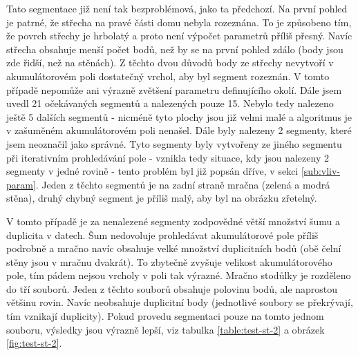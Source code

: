 \documentclass[11pt,twoside,a4paper]{book}
\begin{document}
\begin{changeheight}{3cm}
Tato segmentace již není tak bezproblémová, jako ta předchozí. Na první pohled je patrné, že střecha na pravé části domu nebyla rozeznána. To je způsobeno tím, že povrch střechy je hrbolatý a proto není výpočet parametrů příliš přesný. Navíc střecha obsahuje menší počet bodů, než by se na první pohled zdálo (body jsou zde řidší, než na stěnách). Z těchto dvou důvodů body ze střechy nevytvoří v akumulátorovém poli dostatečný vrchol, aby byl segment rozeznán. V tomto případě nepomůže ani výrazně zvětšení parametru definujícího okolí. Dále jsem uvedl 21 očekávaných segmentů a nalezených pouze 15. Nebylo tedy nalezeno ještě 5 dalších segmentů - nicméně tyto plochy jsou již velmi malé a algoritmus je v zašuměném akumulátorovém poli nenašel. Dále byly nalezeny 2 segmenty, které jsem neoznačil jako správné. Tyto segmenty byly vytvořeny ze  jiného segmentu při iterativním prohledávání pole - vznikla tedy situace, kdy jsou nalezeny 2 segmenty v jedné rovině - tento problém byl již popsán dříve, v sekci \ref{sub:vliv-param}. Jeden z těchto segmentů je na zadní straně mračna (zelená a modrá stěna), druhý chybný segment je příliš malý, aby byl na obrázku zřetelný. 

V tomto případě je za nenalezené segmenty zodpovědné větší množství šumu a duplicita v datech. Šum nedovoluje prohledávat akumulátorové pole příliš podrobně a mračno navíc obsahuje velké množství duplicitních bodů (obě čelní stěny jsou v mračnu dvakrát). To zbytečně zvyšuje velikost akumulátorového pole, tím pádem nejsou vrcholy v poli tak výrazné. Mračno stodůlky je rozděleno do tří souborů. Jeden z těchto souborů obsahuje polovinu bodů, ale naprostou většinu rovin. Navíc neobsahuje duplicitní body (jednotlivé soubory se překrývají, tím vznikají duplicity). Pokud provedu segmentaci pouze na tomto jednom souboru, výsledky jsou výrazně lepší, viz tabulka \ref{table:test-st-2} a obrázek \ref{fig:test-st-2}. 


\end{changeheight}
\end{document}
